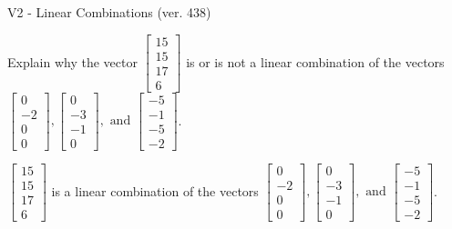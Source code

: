 \begin{exercise}
  \begin{exerciseTitle}V2 - Linear Combinations (ver. 438)\end{exerciseTitle}
  \begin{exerciseStatement}
    Explain why the vector \(\left[\begin{array}{c}
15 \\
15 \\
17 \\
6
\end{array}\right]\)  is or is not a linear 
	combination of the vectors \(\left[\begin{array}{c}
0 \\
-2 \\
0 \\
0
\end{array}\right] , \left[\begin{array}{c}
0 \\
-3 \\
-1 \\
0
\end{array}\right] , \text{ and } \left[\begin{array}{c}
-5 \\
-1 \\
-5 \\
-2
\end{array}\right]\).
	


  \end{exerciseStatement}
  \begin{exerciseAnswer}
   \(\left[\begin{array}{c}
15 \\
15 \\
17 \\
6
\end{array}\right]\) 
  	 is  
	a linear combination of the vectors \(\left[\begin{array}{c}
0 \\
-2 \\
0 \\
0
\end{array}\right] , \left[\begin{array}{c}
0 \\
-3 \\
-1 \\
0
\end{array}\right] , \text{ and } \left[\begin{array}{c}
-5 \\
-1 \\
-5 \\
-2
\end{array}\right]\).

	
  


  \end{exerciseAnswer}
\end{exercise}